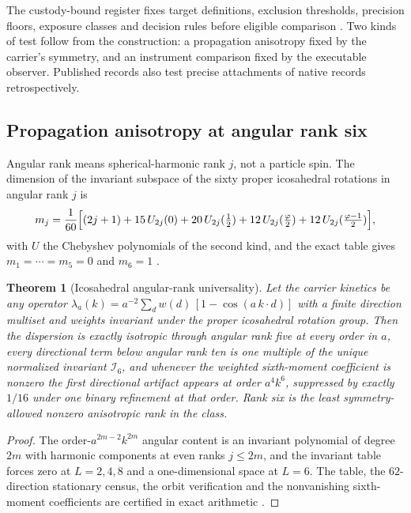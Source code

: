 \documentclass[11pt]{article}
\newtheorem{theorem}{Theorem}[section]
\theoremstyle{definition}
\theoremstyle{remark}
\begin{document}
The custody-bound register fixes target definitions, exclusion thresholds,
precision floors, exposure classes and decision rules before eligible
comparison \cite{ophregister}. Two kinds of test follow from the
construction: a propagation anisotropy fixed by the carrier's symmetry, and
an instrument comparison fixed by the executable observer. Published records
also test precise attachments of native records retrospectively.

\subsection{Propagation anisotropy at angular rank six}
\label{sec:spin-six}

Angular rank means spherical-harmonic rank $j$, not a particle spin. The dimension of the invariant subspace of the sixty proper icosahedral rotations in angular rank $j$ is
\[
m_j=\frac1{60}\Bigl[(2j+1)+15\,U_{2j}(0)+20\,U_{2j}(\tfrac12)
+12\,U_{2j}(\tfrac\varphi2)+12\,U_{2j}(\tfrac{\varphi-1}2)\Bigr],
\]
with $U$ the Chebyshev polynomials of the second kind, and the exact table
gives $m_1=\cdots=m_5=0$ and $m_6=1$ \cite{cohan1958}.

\begin{theorem}[Icosahedral angular-rank universality]
\label{thm:spin-six}
Let the carrier kinetics be any operator
$\lambda_a(k)=a^{-2}\sum_d w(d)\,[1-\cos(a\,k\!\cdot\!d)]$ with a finite
direction multiset and weights invariant under the proper icosahedral
rotation group. Then the dispersion is exactly isotropic through angular rank
five at every order in $a$, every directional term below angular rank ten is
one multiple of the unique normalized invariant $\mathcal I_6$, and whenever
the weighted sixth-moment coefficient is nonzero the first directional
artifact appears at order $a^4k^6$, suppressed by exactly $1/16$ under one
binary refinement at that order. Rank six is the least symmetry-allowed
nonzero anisotropic rank in the class.
\end{theorem}

\begin{proof}
The order-$a^{2m-2}k^{2m}$ angular content is an invariant polynomial of
degree $2m$ with harmonic components at even ranks $j\le2m$, and the
invariant table forces zero at $L=2,4,8$ and a one-dimensional space at
$L=6$. The table, the $62$-direction stationary census, the orbit
verification and the nonvanishing sixth-moment coefficients are certified in
exact arithmetic \cite{ophrepo}.
\end{proof}
\end{document}
